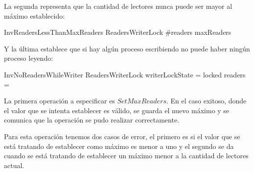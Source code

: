 \documentclass[a4paper, 12pt]{article}
\begin{document}
La segunda representa que la cantidad de lectores nunca puede ser mayor al máximo establecido:
\begin{schema}{InvReadersLessThanMaxReaders}
    ReadersWriterLock
\where
    \#readers \leq maxReaders
\end{schema}

Y la última establece que si hay algún proceso escribiendo no puede haber ningún proceso leyendo:
\begin{schema}{InvNoReadersWhileWriter}
    ReadersWriterLock
\where
    writerLockState = locked \implies readers = \emptyset
\end{schema}

La primera operación a especificar es $SetMaxReaders$.  En el caso exitoso, donde el valor que se intenta establecer es válido, se guarda el nuevo máximo y se comunica que la operación se pudo realizar correctamente.

Para esta operación tenemos dos casos de error, el primero es si el valor que se está tratando de establecer como máximo es menor a uno y el segundo se da cuando se está tratando de establecer un máximo menor a la cantidad de lectores actual.


\end{document}
